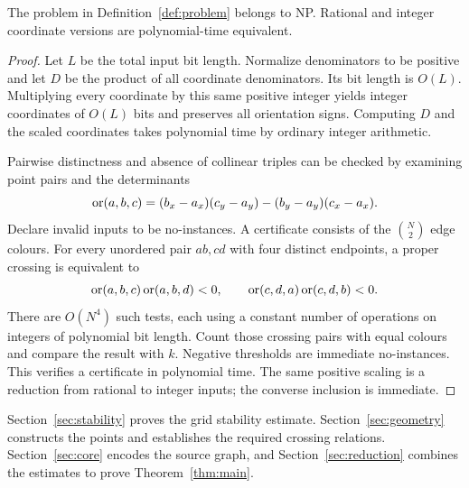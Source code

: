 \begin{proposition}\label{prop:np}
The problem in Definition~\ref{def:problem} belongs to NP. Rational and
integer coordinate versions are polynomial-time equivalent.
\end{proposition}
\begin{proof}
Let $L$ be the total input bit length. Normalize denominators to be
positive and let $D$ be the product of all coordinate denominators.
Its bit length is $O(L)$. Multiplying every coordinate by this same
positive integer yields integer coordinates of $O(L)$ bits and preserves
all orientation signs. Computing $D$ and the scaled coordinates takes
polynomial time by ordinary integer arithmetic.

Pairwise distinctness and absence of collinear triples can be checked
by examining point pairs and the determinants
\[
 \operatorname{or}(a,b,c)=(b_x-a_x)(c_y-a_y)-(b_y-a_y)(c_x-a_x).
\]
Declare invalid inputs to be no-instances. A certificate consists of the
$\binom N2$ edge colours. For every unordered pair $ab,cd$ with four
distinct endpoints, a proper crossing is equivalent to
\[
 \operatorname{or}(a,b,c)\operatorname{or}(a,b,d)<0,
 \qquad \operatorname{or}(c,d,a)\operatorname{or}(c,d,b)<0.
\]
There are $O(N^4)$ such tests, each using a constant number of operations
on integers of polynomial bit length. Count those crossing pairs with
equal colours and compare the result with $k$. Negative thresholds are
immediate no-instances. This verifies a certificate in polynomial time.
The same positive scaling is a reduction from rational to integer inputs;
the converse inclusion is immediate.
\end{proof}

Section~\ref{sec:stability} proves the grid stability estimate.
Section~\ref{sec:geometry} constructs the points and establishes the
required crossing relations. Section~\ref{sec:core} encodes the source
graph, and Section~\ref{sec:reduction} combines the estimates to prove
Theorem~\ref{thm:main}.
